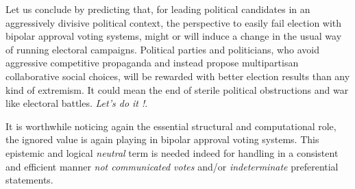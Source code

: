 Let us conclude by predicting that, for leading political candidates in an aggressively divisive political context, the perspective to easily fail election with bipolar approval voting systems, might or will induce a change in the usual way of running electoral campaigns. Political parties and politicians, who avoid aggressive competitive propaganda and instead propose multipartisan collaborative social choices, will be rewarded with better election results than any kind of extremism. It could mean the end of sterile political obstructions and war like electoral battles. \emph{Let's do it !}.

It is worthwhile noticing again the essential structural and computational role, the ignored value is again playing in bipolar approval voting systems. This epistemic and logical \emph{neutral} term is needed indeed for handling in a consistent and efficient manner \emph{not communicated votes} and/or \emph{indeterminate} preferential statements.
 
